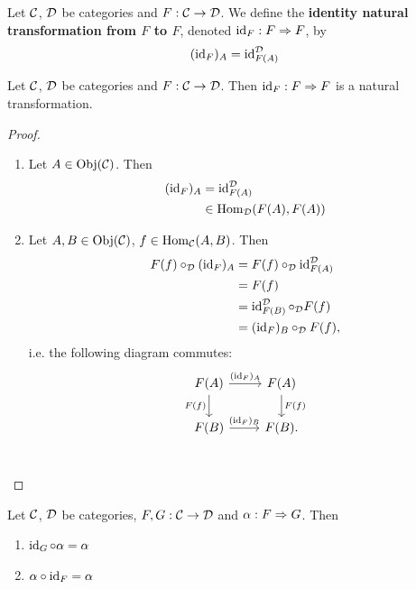 \documentclass{book}
\begin{document}
	\begin{defn} 
		Let $\mathcal{C}$, $\mathcal{D}$ be categories and $F: \mathcal{C} \rightarrow \mathcal{D}$. We define the \textbf{identity natural transformation from $F$ to $F$}, denoted $\operatorname{id}_F: F \Rightarrow F$, by 
		$$(\operatorname{id}_F)_A = \operatorname{id}_{F(A)}^{\mathcal{D}}$$
	\end{defn}
	
	\begin{ex} 
		Let $\mathcal{C}$, $\mathcal{D}$ be categories and $F: \mathcal{C} \rightarrow \mathcal{D}$. Then $\operatorname{id}_F: F \Rightarrow F$ is a natural transformation.
	\end{ex}
	
	\begin{proof}\
		\begin{enumerate}
			\item Let $A \in \operatorname{Obj}(\mathcal{C})$. Then 
			\begin{align*}
				(\operatorname{id}_F)_A 
				& = \operatorname{id}_{F(A)}^{\mathcal{D}} \\
				& \in \operatorname{Hom}_{\mathcal{D}}(F(A), F(A))
			\end{align*}
			\item Let $A,B \in \operatorname{Obj}(\mathcal{C})$, $f \in \operatorname{Hom}_{\mathcal{C}}(A,B)$. Then 
			\begin{align*}
				F(f) \circ_{\mathcal{D}} (\operatorname{id}_F)_A
				& = F(f) \circ_{\mathcal{D}} \operatorname{id}_{F(A)}^{\mathcal{D}} \\
				& = F(f) \\
				& = \operatorname{id}_{F(B)}^{\mathcal{D}} \circ_{\mathcal{D}} F(f) \\
				& = (\operatorname{id}_F)_{B} \circ_{\mathcal{D}} F(f),
			\end{align*}
			i.e. the following diagram commutes:
			\[ 
			\begin{tikzcd}
				F(A)  \arrow[r, "(\id_F)_A"]  \arrow[d, "F(f)"']  & F(A)   \arrow[d, "F(f)"]\\
				F(B) \arrow[r, "(\id_F)_B"] &  F(B). \\
			\end{tikzcd}
			\]
		\end{enumerate}
	\end{proof}
	
	\begin{ex} 
		Let $\mathcal{C}$, $\mathcal{D}$ be categories, $F,G: \mathcal{C} \rightarrow \mathcal{D}$ and $\alpha : F \Rightarrow G$. Then 
		\begin{enumerate}
			\item $\operatorname{id}_{G} \circ \alpha = \alpha$
			\item $\alpha \circ \operatorname{id}_F = \alpha$
		\end{enumerate} 
	\end{ex}
	
\end{document}
